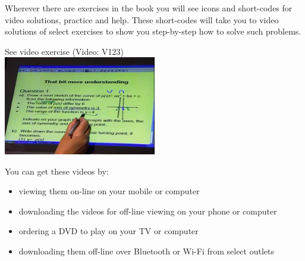 {\Large

Wherever there are exercises in the book you will see icons and short-codes for video solutions,
practice and help. These short-codes will take you to video solutions of select exercises to show you
step-by-step how to solve such problems. \par

\begin{center}
See video exercise  (Video: V123) \\
\includegraphics[width=0.5\textwidth]{title_images/mindsetexercise.png}
\end{center}
\par
You can get these videos by:
\begin{itemize}
    \item viewing them on-line on your mobile or computer
    \item downloading the videos for off-line viewing on your phone or computer
    \item ordering a DVD to play on your TV or computer
    \item downloading them off-line over Bluetooth or Wi-Fi from select outlets
\end{itemize}
}


